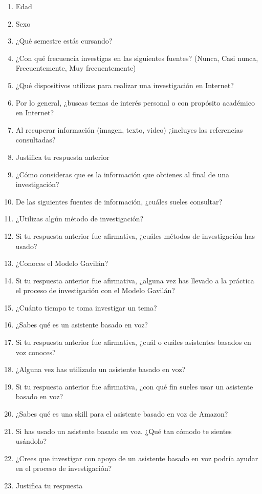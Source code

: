 \begin{tcolorbox}[colback=white!25!white,colframe=blue]
  \begin{enumerate}
    \item Edad
    \item Sexo
    \item ¿Qué semestre estás cursando?
    \item ¿Con qué frecuencia investigas en las siguientes fuentes? (Nunca, Casi nunca, Frecuentemente, Muy frecuentemente)
    \item ¿Qué dispositivos utilizas para realizar una investigación en Internet?
    \item Por lo general, ¿buscas temas de interés personal o con propósito académico en Internet?
    \item Al recuperar información (imagen, texto, video) ¿incluyes las referencias consultadas?
    \item Justifica tu respuesta anterior
    \item ¿Cómo consideras que es la información que obtienes al final de una investigación?
    \item De las siguientes fuentes de información, ¿cuáles sueles consultar?
    \item ¿Utilizas algún método de investigación?
    \item Si tu respuesta anterior fue afirmativa, ¿cuáles métodos de investigación has usado?
    \item ¿Conoces el Modelo Gavilán?
    \item Si tu respuesta anterior fue afirmativa, ¿alguna vez has llevado a la práctica el proceso de investigación con el Modelo Gavilán?
    \item ¿Cuánto tiempo te toma investigar un tema?
    \item ¿Sabes qué es un asistente basado en voz?
    \item Si tu respuesta anterior fue afirmativa, ¿cuál o cuáles asistentes basados en voz conoces?
    \item ¿Alguna vez has utilizado un asistente basado en voz?
    \item Si tu respuesta anterior fue afirmativa, ¿con qué fin sueles usar un asistente basado en voz?
    \item ¿Sabes qué es una skill para el asistente basado en voz de Amazon?
    \item Si has usado un asistente basado en voz. ¿Qué tan cómodo te sientes usándolo?
    \item ¿Crees que investigar con apoyo de un asistente basado en voz podría ayudar en el proceso de investigación?
    \item Justifica tu respuesta
  \end{enumerate}
\end{tcolorbox}

